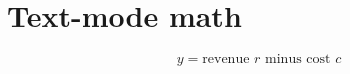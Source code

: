 \section{Text-mode math}

\begin{equation}
y = \text{revenue $r$ minus cost $c$} \label{eq:profit}
\end{equation}
